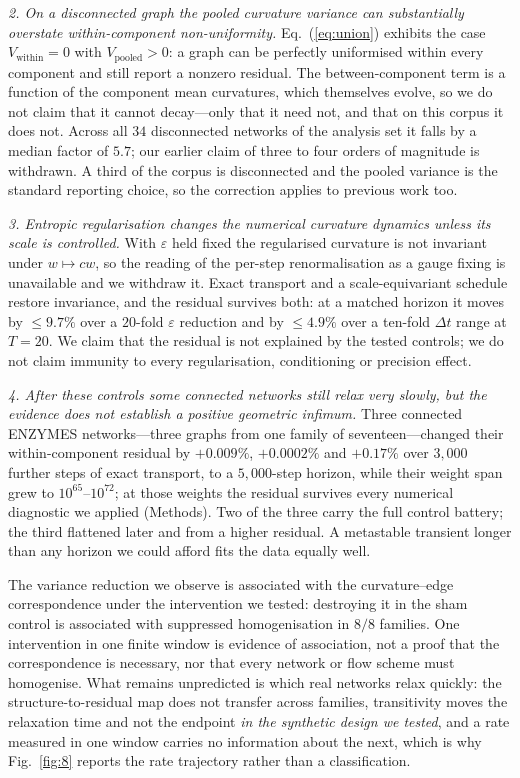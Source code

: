 \documentclass[11pt]{article}
\begin{document}
\emph{2. On a disconnected graph the pooled curvature variance can
substantially overstate within-component non-uniformity.} Eq.~(\ref{eq:union})
exhibits the case $V_{\mathrm{within}}=0$ with $V_{\mathrm{pooled}}>0$: a graph
can be perfectly uniformised within every component and still report a nonzero
residual. The between-component term is a function of the component mean
curvatures, which themselves evolve, so we do not claim that it cannot
decay---only that it need not, and that on this corpus it does not. Across all
$34$ disconnected networks of the analysis set it falls by a median factor of
$5.7$; our earlier claim of three to four orders of magnitude is withdrawn. A third of the corpus is
disconnected and the pooled variance is the standard reporting choice, so the
correction applies to previous work too.

\emph{3. Entropic regularisation changes the numerical curvature dynamics
unless its scale is controlled.} With $\varepsilon$ held fixed the regularised
curvature is not invariant under $w\mapsto cw$, so the reading of the per-step
renormalisation as a gauge fixing is unavailable and we withdraw it. Exact
transport and a scale-equivariant schedule restore invariance, and the residual
survives both: at a matched horizon it moves by $\le9.7\%$ over a $20$-fold
$\varepsilon$ reduction and by $\le4.9\%$ over a ten-fold $\Delta t$ range at
$T=20$. We claim that the residual is not explained by the tested controls;
we do not claim immunity to every regularisation, conditioning or precision
effect.

\emph{4. After these controls some connected networks still relax very slowly,
but the evidence does not establish a positive geometric infimum.} Three
connected {ENZYMES} networks---three graphs from one family of
seventeen---changed their within-component residual by $+0.009\%$, $+0.0002\%$
and $+0.17\%$ over $3{,}000$ further steps of exact transport, to a
$5{,}000$-step horizon, while their weight span grew to $10^{65}$--$10^{72}$;
at those weights the residual survives every numerical diagnostic we applied
(Methods). Two of the three carry the full control battery; the third flattened
later and from a higher residual. A metastable transient longer than any horizon
we could afford fits the data equally well.

The variance reduction we observe is associated with the curvature--edge
correspondence under the intervention we tested: destroying it in the sham
control is associated with suppressed homogenisation in $8/8$ families. One
intervention in one finite window is evidence of association, not a proof that
the correspondence is necessary, nor that every network or flow scheme must
homogenise. What remains unpredicted is which real networks relax quickly: the
structure-to-residual map does not transfer across families, transitivity moves
the relaxation time and not the endpoint \emph{in the synthetic design we
tested}, and a rate measured in one window
carries no information about the next, which is why Fig.~\ref{fig:8} reports
the rate trajectory rather than a classification.
\end{document}
